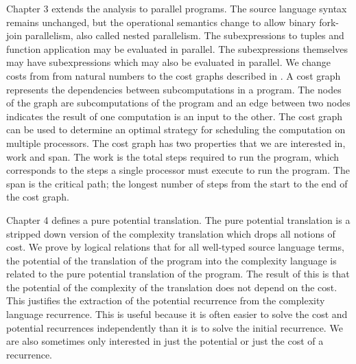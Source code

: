 Chapter 3 extends the analysis to parallel programs. The source language syntax
remains unchanged, but the operational semantics change to allow binary
fork-join parallelism, also called nested parallelism. The subexpressions to
tuples and function application may be evaluated in parallel. The
subexpressions themselves may have subexpressions which may also be evaluated
in parallel. We change costs from from natural numbers to the cost graphs
described in \citet{Harper2012PFPL}. A cost graph represents the dependencies
between subcomputations in a program.  The nodes of the graph are
subcomputations of the program and an edge between two nodes indicates the
result of one computation is an input to the other. The cost graph can be used
to determine an optimal strategy for scheduling the computation on multiple
processors. The cost graph has two properties that we are interested in, work
and span. The work is the total steps required to run the program, which
corresponds to the steps a single processor must execute to run the program.
The span is the critical path; the longest number of steps from the start to
the end of the cost graph.



Chapter 4 defines a pure potential translation. The pure potential translation
is a stripped down version of the complexity translation which drops all
notions of cost. We prove by logical relations that for all well-typed source
language terms, the potential of the translation of the program into the
complexity language is related to the pure potential translation of the
program. The result of this is that the potential of the complexity of the
translation does not depend on the cost. This justifies the extraction of the
potential recurrence from the complexity language recurrence. This is useful
because it is often easier to solve the cost and potential recurrences
independently than it is to solve the initial recurrence. We are also sometimes
only interested in just the potential or just the cost of a recurrence.
